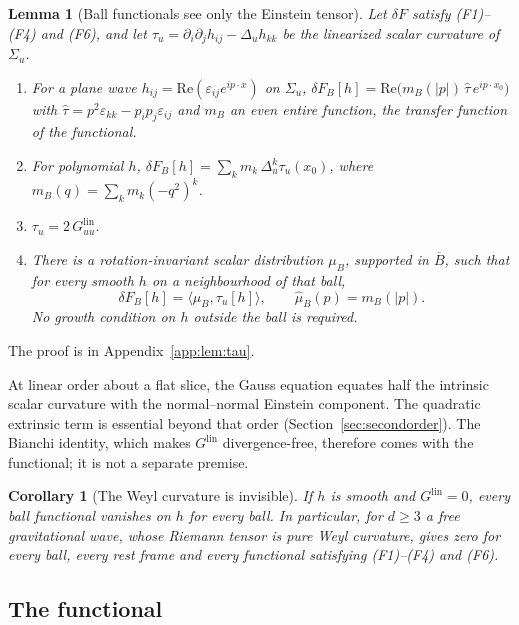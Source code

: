 \documentclass[12pt]{article}
\newtheorem{lemma}[theorem]{Lemma}
\newtheorem{corollary}[theorem]{Corollary}
\theoremstyle{definition}
\theoremstyle{remark}
\newcommand{\Glin}{G^{\mathrm{lin}}}
\begin{document}
\begin{lemma}[Ball functionals see only the Einstein tensor]\label{lem:tau}
Let \(\delta F\) satisfy (F1)--(F4) and (F6), and let
\(\tau_u=\partial_i\partial_jh_{ij}-\Delta_uh_{kk}\) be the linearized scalar curvature of
\(\Sigma_u\).
\begin{enumerate}[label=(\alph*),leftmargin=2em,itemsep=1pt]
\item For a plane wave \(h_{ij}=\mathrm{Re}(\varepsilon_{ij}e^{ip\cdot x})\) on \(\Sigma_u\),
\(\delta F_B[h]=\mathrm{Re}\big(m_B(|p|)\,\hat\tau\,e^{ip\cdot x_0}\big)\) with
\(\hat\tau=p^2\varepsilon_{kk}-p_ip_j\varepsilon_{ij}\) and \(m_B\) an even entire function,
the \emph{transfer function} of the functional.
\item For polynomial \(h\), \(\delta F_B[h]=\sum_k m_k\,\Delta_u^k\tau_u(x_0)\), where
\(m_B(q)=\sum_km_k(-q^2)^k\).
\item \(\tau_u=2\,\Glin_{uu}\).
\item There is a rotation-invariant scalar distribution \(\mu_B\), supported in
\(\overline B\), such that for every smooth \(h\) on a neighbourhood of that ball,
\[
\delta F_B[h]=\langle\mu_B,\tau_u[h]\rangle,
\qquad \widehat\mu_B(p)=m_B(|p|).
\]
No growth condition on \(h\) outside the ball is required.
\end{enumerate}
\end{lemma}

The proof is in Appendix~\ref{app:lem:tau}.


At linear order about a flat slice, the Gauss equation equates half
the intrinsic scalar curvature with the normal--normal Einstein component.
The quadratic extrinsic term is essential beyond that order
(Section~\ref{sec:secondorder}). The
Bianchi identity, which makes \(\Glin\) divergence-free, therefore comes with the
functional; it is not a separate premise.

\begin{corollary}[The Weyl curvature is invisible]\label{cor:weyl}
If \(h\) is smooth and \(\Glin=0\), every ball functional vanishes on \(h\) for every
ball. In particular, for \(d\ge3\) a free gravitational wave, whose Riemann tensor is pure
Weyl curvature, gives zero for every ball, every rest frame and every functional satisfying
(F1)--(F4) and (F6).
\end{corollary}

\subsection{The functional}\label{subsec:identity}
\end{document}
